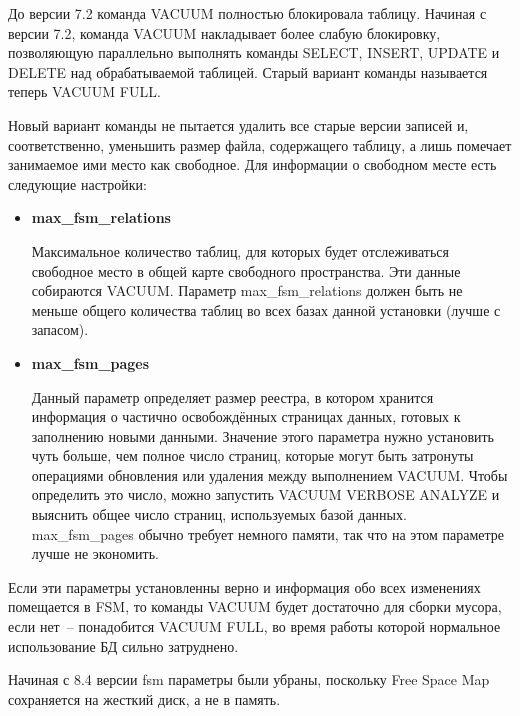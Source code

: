 До версии 7.2 команда VACUUM полностью блокировала таблицу. Начиная с версии 7.2, команда VACUUM накладывает более слабую 
блокировку, позволяющую параллельно выполнять команды SELECT, INSERT, UPDATE и DELETE над обрабатываемой таблицей. 
Старый вариант команды называется теперь VACUUM FULL.

Новый вариант команды не пытается удалить все старые версии записей и, соответственно, уменьшить размер файла, содержащего таблицу, 
а лишь помечает занимаемое ими место как свободное. Для информации о свободном месте есть следующие настройки:
\begin{itemize}
\item \textbf{max\_fsm\_relations}

Максимальное количество таблиц, для которых будет отслеживаться свободное место в общей карте свободного пространства. 
Эти данные собираются VACUUM. Параметр max\_fsm\_relations должен быть не меньше общего количества таблиц во всех 
базах данной установки (лучше с запасом). 

\item \textbf{max\_fsm\_pages}

Данный параметр определяет размер реестра, в котором хранится информация о частично освобождённых страницах данных, 
готовых к заполнению новыми данными. Значение этого параметра нужно установить чуть больше, чем полное число страниц, 
которые могут быть затронуты 
операциями обновления или удаления между выполнением VACUUM. Чтобы определить это число, можно запустить VACUUM VERBOSE ANALYZE 
и выяснить общее число страниц, используемых базой данных. max\_fsm\_pages обычно требует немного памяти, так что на этом 
параметре лучше не экономить. 
\end{itemize}

Если эти параметры установленны верно и информация обо всех изменениях помещается в FSM, 
то команды VACUUM будет достаточно для сборки мусора, если нет~-- понадобится
VACUUM FULL, во время работы которой нормальное использование БД сильно затруднено.

Начиная с 8.4 версии fsm параметры были убраны, поскольку Free Space Map сохраняется на жесткий диск, а не в память.

